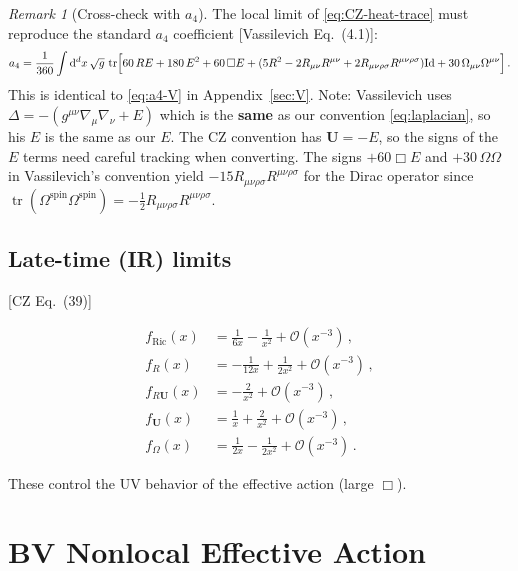 \documentclass[12pt,a4paper]{article}
\theoremstyle{definition}
\theoremstyle{remark}
\newtheorem{remark}[proposition]{Remark}
\newcommand{\tr}{\operatorname{tr}}
\newcommand{\Rsq}{R_{\mu\nu\rho\sigma}R^{\mu\nu\rho\sigma}}
\newcommand{\Ricsq}{R_{\mu\nu}R^{\mu\nu}}
\newcommand{\dd}{\mathrm{d}}
\newcommand{\Id}{\mathrm{Id}}
\newcommand{\fromlit}[1]{\textcolor{blue!70!black}{\textsf{[#1]}}}
\begin{document}
\begin{remark}[Cross-check with $a_4$]
The local limit of \eqref{eq:CZ-heat-trace} must reproduce the
standard $a_4$ coefficient \fromlit{Vassilevich Eq.~(4.1)}:
\begin{equation}
  a_4 = \frac{1}{360}\int\dd^d x\,\sqrt{g}\,\tr\Bigl[
  60\,RE + 180\,E^2 + 60\,\Box E
  + (5R^2 - 2\Ricsq + 2\Rsq)\Id
  + 30\,\Omega_{\mu\nu}\Omega^{\mu\nu}
  \Bigr]\,.
  \label{eq:a4-vassilevich}
\end{equation}
This is identical to \eqref{eq:a4-V} in Appendix~\ref{sec:V}.
Note: Vassilevich uses $\Delta = -(g^{\mu\nu}\nabla_\mu\nabla_\nu + E)$
which is the \textbf{same} as our convention \eqref{eq:laplacian},
so his $E$ is the same as our $E$.
The CZ convention has $\mathbf{U} = -E$, so the signs of the $E$ terms
need careful tracking when converting.  The signs $+60\Box E$ and
$+30\,\Omega\Omega$ in Vassilevich's convention yield $-15\Rsq$
for the Dirac operator since
$\tr(\Omega^{\text{spin}}\Omega^{\text{spin}}) = -\frac{1}{2}\Rsq$.
\end{remark}


\subsection{Late-time (IR) limits}

\fromlit{CZ Eq.~(39)}

\begin{equation}
  \begin{aligned}
  f_{\text{Ric}}(x) &= \frac{1}{6x} - \frac{1}{x^2}
    + \mathcal{O}(x^{-3})\,,\\
  f_R(x) &= -\frac{1}{12x} + \frac{1}{2x^2}
    + \mathcal{O}(x^{-3})\,,\\
  f_{R\mathbf{U}}(x) &= -\frac{2}{x^2} + \mathcal{O}(x^{-3})\,,\\
  f_\mathbf{U}(x) &= \frac{1}{x} + \frac{2}{x^2}
    + \mathcal{O}(x^{-3})\,,\\
  f_\Omega(x) &= \frac{1}{2x} - \frac{1}{2x^2}
    + \mathcal{O}(x^{-3})\,.
  \end{aligned}
  \label{eq:late-time}
\end{equation}

These control the UV behavior of the effective action (large $\Box$).


\newpage
\section{BV Nonlocal Effective Action}
\label{sec:BV-action}
\end{document}
